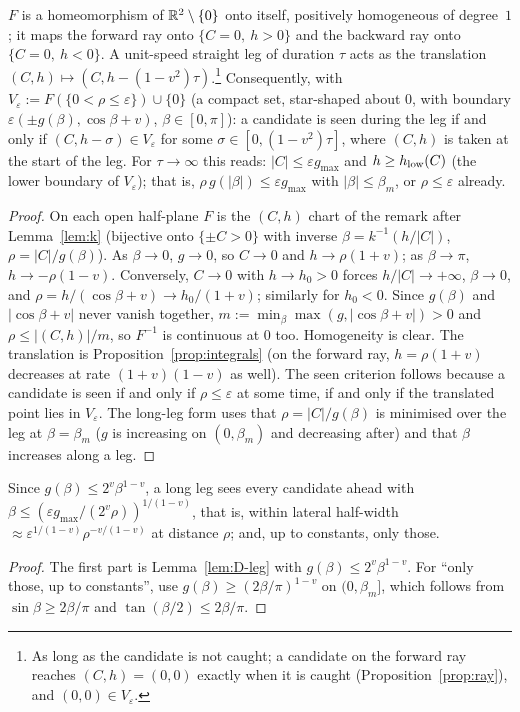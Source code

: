 \begin{lemma}\label{lem:D-leg}
$F$ is a homeomorphism of $\mathbb{R}^2\setminus\{0\}$ onto itself, positively homogeneous of degree~$1$; it maps the forward ray onto
$\{C=0,\ h>0\}$ and the backward ray onto $\{C=0,\ h<0\}$. A unit-speed straight leg of duration $\tau$ acts as the translation
$(C,h)\mapsto(C,h-(1-v^2)\tau)$.\footnote{As long as the candidate is not caught; a candidate on the forward ray reaches
$(C,h)=(0,0)$ exactly when it is caught (Proposition~\ref{prop:ray}), and $(0,0)\in V_\varepsilon$.} Consequently, with
$V_\varepsilon:=F(\{0<\rho\le\varepsilon\})\cup\{0\}$ (a compact set, star-shaped about $0$, with boundary
$\varepsilon(\pm g(\beta),\cos\beta+v)$, $\beta\in[0,\pi]$): a candidate is seen during the leg if and only if
$(C,h-\sigma)\in V_\varepsilon$ for some $\sigma\in[0,(1-v^2)\tau]$, where $(C,h)$ is taken at the start of the leg.
For $\tau\to\infty$ this reads: $|C|\le\varepsilon g_{\max}$ and $h\ge h_{\rm low}(C)$ (the lower boundary of
$V_\varepsilon$); that is, $\rho\,g(|\beta|)\le\varepsilon g_{\max}$ with $|\beta|\le\beta_m$, or $\rho\le\varepsilon$ already.
\end{lemma}
\begin{proof}
On each open half-plane $F$ is the $(C,h)$ chart of the remark after Lemma~\ref{lem:k} (bijective onto $\{\pm C>0\}$ with
inverse $\beta=k^{-1}(h/|C|)$, $\rho=|C|/g(\beta)$). As $\beta\to0$, $g\to0$, so $C\to0$ and $h\to\rho(1+v)$; as
$\beta\to\pi$, $h\to-\rho(1-v)$. Conversely, $C\to0$ with $h\to h_0>0$ forces $h/|C|\to+\infty$, $\beta\to0$, and
$\rho=h/(\cos\beta+v)\to h_0/(1+v)$; similarly for $h_0<0$. Since $g(\beta)$ and $|\cos\beta+v|$ never vanish together,
$m:=\min_\beta\max(g,|\cos\beta+v|)>0$ and $\rho\le|(C,h)|/m$, so $F^{-1}$ is continuous at $0$ too. Homogeneity is clear.
The translation is Proposition~\ref{prop:integrals} (on the forward ray, $h=\rho(1+v)$ decreases at rate $(1+v)(1-v)$ as
well). The seen criterion follows because a candidate is seen if and only if $\rho\le\varepsilon$ at some time, if and only if
the translated point lies in $V_\varepsilon$. The long-leg form uses that $\rho=|C|/g(\beta)$ is minimised over the leg at
$\beta=\beta_m$ ($g$ is increasing on $(0,\beta_m)$ and decreasing after) and that $\beta$ increases along a leg.
\end{proof}

\begin{corollary}[Needle]\label{cor:D-needle}
Since $g(\beta)\le2^v\beta^{1-v}$, a long leg sees every candidate ahead with
$\beta\le(\varepsilon g_{\max}/(2^v\rho))^{1/(1-v)}$, that is, within lateral half-width
$\approx\varepsilon^{1/(1-v)}\rho^{-v/(1-v)}$ at distance $\rho$; and, up to constants, only those.
\end{corollary}
\begin{proof}
The first part is Lemma~\ref{lem:D-leg} with $g(\beta)\le2^v\beta^{1-v}$. For ``only those, up to constants'', use
$g(\beta)\ge(2\beta/\pi)^{1-v}$ on $(0,\beta_m]$, which follows from $\sin\beta\ge2\beta/\pi$ and $\tan(\beta/2)\le2\beta/\pi$.
\end{proof}

